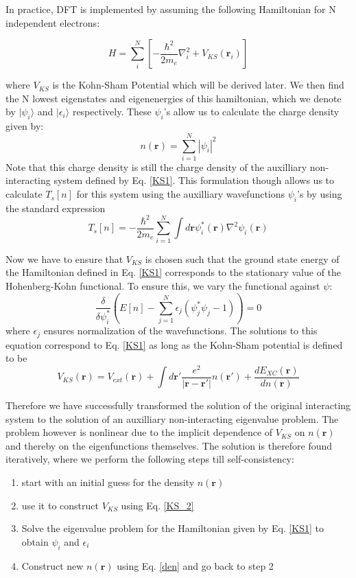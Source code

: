 \documentclass[12pt,a4paper]{article}
\newcommand{\ra}{\rangle}
\newcommand{\rmb}{\mathbf{r}}
\newcommand{\dens}{n(\rmb)}
\begin{document}
In practice, DFT is implemented by  assuming the following Hamiltonian for N independent electrons:

\begin{equation} \label{KS1}
H=\sum_{i}^{N} \left[ -\dfrac{\hbar^2}{2m_e}\nabla_i^2 +V_{KS}(\rmb_i)\right]
\end{equation}

 where $V_{KS}$ is the Kohn-Sham Potential which will be derived later. We then find the N lowest eigenstates and eigenenergies of this hamiltonian, which we denote by $|\psi_i\ra$
 and $|\epsilon_i\ra$ respectively. These $\psi_i$'s allow us to calculate the charge density given by:
 \begin{equation}\label{den}
 \dens=\sum_{i=1}^{N} |\psi_i|^2
 \end{equation}
  Note that this charge density is still the charge density of the auxilliary non-interacting system defined by Eq. \ref{KS1}. This formulation though allows us to calculate $T_s[n]$ for this system using the auxilliary wavefunctions $\psi_i$'s by using the standard expression
 \begin{equation}
 T_s[n]=-\dfrac{\hbar^2}{2m_e} \sum_{i=1}^{N} \int d\rmb \psi^*_i(\rmb) \nabla^2 \psi_i(\rmb)
 \end{equation}
 
 Now we have to ensure that $V_{KS}$ is chosen such that the ground state energy of the Hamiltonian defined in Eq. \ref{KS1} corresponds to the stationary value of the Hohenberg-Kohn functional. To ensure this, we vary the functional against  $\psi$:
 \begin{equation}
  \dfrac{\delta}{\delta \psi_i^*}\left( E[n] - \sum_{j=1}^{N} \epsilon_j (\psi^*_j \psi_j -1) \right)=0
  \end{equation} 
  where $\epsilon_j$ ensures normalization of the wavefunctions. The solutions to this equation correspond to Eq. \ref{KS1} as long as the Kohn-Sham potential is defined to be
 \begin{equation}\label{KS_2}
 V_{KS}(\rmb)=V_{ext}(\rmb) + \int d\rmb' \dfrac{e^2}{|\rmb -\rmb'|} n(\rmb') + \dfrac{d E_{XC}(\rmb)}{d\dens}
 \end{equation}

Therefore we have successfully transformed the solution of the original interacting system to the solution of an auxilliary non-interacting eigenvalue problem. The problem however is nonlinear due to the implicit dependence of $V_{KS}$ on $\dens$ and thereby on the eigenfunctions themselves. The solution is therefore found iteratively, where we perform the following steps till self-consistency:
\begin{enumerate}
\item start with an initial guess for the density $\dens$
\item use it to construct $V_{KS}$ using Eq. \ref{KS_2}
\item Solve the eigenvalue problem for the Hamiltonian given by Eq. \ref{KS1} to obtain $\psi_i$ and $\epsilon_i$ 
\item Construct new $\dens$ using Eq. \ref{den} and go back to step 2
\end{enumerate}
\end{document}
